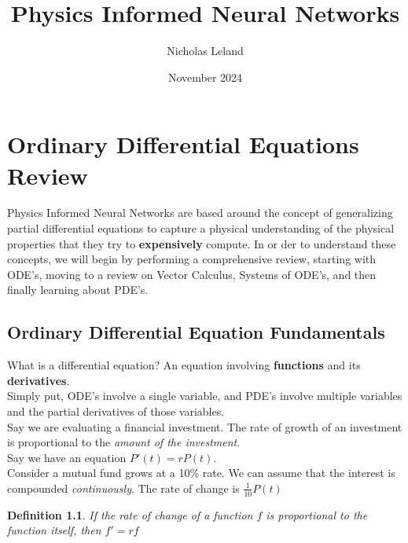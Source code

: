 \documentclass[10pt, oneside]{report}
\title{Physics Informed Neural Networks}
\author{Nicholas Leland}
\date{November 2024}
\newtheorem{defn}{Definition}
\begin{document}
\maketitle
\tableofcontents

\vspace{.25in}


\chapter{Ordinary Differential Equations Review}
Physics Informed Neural Networks are based around the concept of generalizing partial differential equations to capture a physical understanding of the physical properties that they try to \textbf{expensively} compute.  In or der to understand these concepts, we will begin by performing a comprehensive review, starting with ODE's, moving to a review on Vector Calculus, Systems of ODE's, and then finally learning about PDE's.  

\section{Ordinary Differential Equation Fundamentals}
What is a differential equation? An equation involving \textbf{functions} and its \textbf{derivatives}.  \\
Simply put, ODE's involve a single variable, and PDE's involve multiple variables and the partial derivatives of those variables.\\

Say we are evaluating a financial investment.  The rate of growth of an investment is proportional to the \textit{amount of the investment}. \\ 
Say we have an equation $P'(t) = rP(t)$. \\ 
Consider a mutual fund grows at a 10\% rate.  We can assume that the interest is compounded \textit{continuously}.  The rate of change is $\frac{1}{10}P(t)$ \\

\begin{defn}
    If the rate of change of a function $f$ is proportional to the function itself, then $f'=rf$
\end{defn}
\end{document}
